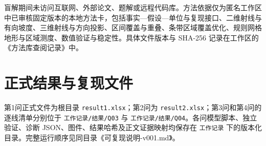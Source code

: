 \documentclass[UTF8,a4paper,12pt]{ctexart}
\begin{document}
盲解期间未访问互联网、外部论文、题解或远程代码库。方法依据仅为匿名工作区中已审核固定版本的本地方法卡，包括事实—假设—单位与复现接口、二维射线与有向坡度、三维射线与方向投影、区间覆盖与重叠、条带区域覆盖优化、规则网格地形与区域测度、数值验证与稳定性。具体文件版本与 SHA-256 记录在工作区的《方法库查阅记录》中。

\appendix
\section{正式结果与复现文件}

第1问正式文件为根目录 \texttt{result1.xlsx}；第2问为 \texttt{result2.xlsx}；第3问和第4问的逐线清单分别位于 \texttt{工作记录/结果/Q03} 与 \texttt{工作记录/结果/Q04}。各问模型脚本、独立验证、诊断 JSON、图件、结果哈希及正文证据映射均保存在 \texttt{工作记录} 下的版本化目录。完整运行顺序见同目录《可复现说明-v001.md》。
\end{document}
